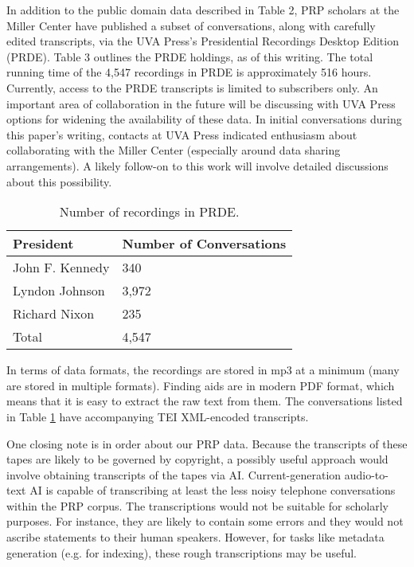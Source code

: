\documentclass[12pt, oneside]{article}   	%
\begin{document}
In addition to the public domain data described in Table 2, PRP scholars at the Miller Center have published a subset of conversations, along with carefully edited transcripts, via the UVA Press’s Presidential Recordings Desktop Edition (PRDE).  Table 3 outlines the PRDE holdings, as of this writing.  The total running time of the 4,547 recordings in PRDE is approximately 516 hours.  Currently, access to the PRDE transcripts is limited to subscribers only.  An important area of collaboration in the future will be discussing with UVA Press options for widening the availability of these data.  In initial conversations during this paper's writing, contacts at UVA Press indicated enthusiasm about collaborating with the Miller Center (especially around data sharing arrangements).  A likely follow-on to this work will involve detailed discussions about this possibility.   

\begin{table}[htp]
\caption{Number of recordings in PRDE.}
\begin{center}
\begin{tabular}{ p{1.75in} p{2in}}
\toprule
President				&	Number of Conversations		\\
\midrule
 John F. Kennedy	 	& 	340 				\\
\midrule
 Lyndon Johnson	 	& 	3,972 				\\
\midrule
 Richard Nixon		 	& 	235			 \\
\bottomrule
Total					&	4,547		\\
\bottomrule
\end{tabular}
\end{center}
\label{table.data.prde}
\end{table}%

In terms of data formats, the recordings are stored in mp3 at a minimum (many are stored in multiple formats).  Finding aids are in modern PDF format, which means that it is easy to extract the raw text from them.  The conversations listed in Table \ref{table.data.prde} have accompanying TEI XML-encoded transcripts.  

One closing note is in order about our PRP data.  Because the transcripts of these tapes are likely to be governed by copyright, a possibly useful approach would involve obtaining transcripts of the tapes via AI.  Current-generation audio-to-text AI is capable of transcribing at least the less noisy telephone conversations within the PRP corpus.  The transcriptions would not be suitable for scholarly purposes.  For instance, they are likely to contain some errors and they would not ascribe statements to their human speakers.  However, for tasks like metadata generation (e.g. for indexing), these rough transcriptions may be useful.   
\end{document}
